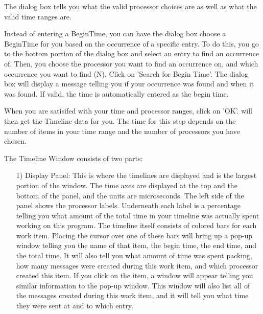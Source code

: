 \begin{enumerate}
   The dialog box tells you what the valid processor choices are as well as what
   the valid time ranges are.

   Instead of entering a BeginTime, you can have the dialog box choose a
   BeginTime for you based on the occurrence of a specific entry.  To do this,
   you go to the bottom portion of the dialog box and select an entry to find an
   occurrence of.  Then, you choose the processor you want to find an occurrence
   on, and which occurrence you want to find (N).  Click on 'Search for Begin
   Time'.  The dialog box will display a message telling you if your occurrence
   was found and when it was found.  If valid, the time is automatically entered
   as the begin time.

   When you are satisifed with your time and processor ranges, click on 'OK'.
   \projections{} will then get the Timeline data for you.  The time for this step
   depends on the number of items in your time range and the number of
   processors you have chosen.

   The Timeline Window consists of two parts:
   \begin{enumerate}
   \item[1)]
      Display Panel:
      This is where the timelines are displayed and is the largest portion of
      the window.  The time axes are displayed at the top and the bottom of the
      panel, and the units are microseconds.  The left side of the panel shows
      the processor labels.  Underneath each label is a percentage telling you
      what amount of the total time in your timeline was actually spent working
      on this program.  The timeline itself consists of colored bars for each
      work item.  Placing the cursor over one of these bars will bring up a
      pop-up window telling you the name of that item, the begin time, the end
      time, and the total time.  It will also tell you what amount of time was
      spent packing, how many messages were created during this work item, and
      which processor created this item.  If you click on the item, a window
      will appear telling you similar information to the pop-up window.  This
      window will also list all of the messages created during this work item,
      and it will tell you what time they were sent at and to which entry.


\end{enumerate}
\end{enumerate}
